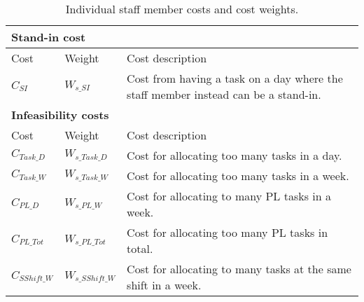 \begin{table}[!h]
\centering
\caption{Individual staff member costs and cost weights.}
\label{tab:staff member_costs}
\begin{tabular}{|l|l|p{7cm}|}
\hline
\multicolumn{3}{|l|}{\cellcolor{gray!90} \textbf{Stand-in cost}} \\ \hline
\rowcolor{Gray} Cost & Weight & Cost description \\ \hline
$C_{SI}$ & $W_{s\_SI}$ & Cost from having a task on a day where the staff member instead can be a stand-in. \\ \hline
\multicolumn{3}{|l|}{\cellcolor{gray!90} \textbf{Infeasibility costs}} \\ \hline
\rowcolor{Gray} Cost & Weight & Cost description \\ \hline
$C_{Task\_D}$ & $W_{s\_Task\_D}$ & Cost for allocating too many tasks in a day. \\ \hline
$C_{Task\_W}$ & $W_{s\_Task\_W}$ & Cost for allocating too many tasks in a week.  \\ \hline
$C_{PL\_D}$ & $W_{s\_PL\_W}$ & Cost for allocating to many PL tasks in a week. \\ \hline
$C_{PL\_Tot}$ & $W_{s\_PL\_Tot}$ & Cost for allocating too many PL tasks in total. \\ \hline
$C_{SShift\_W}$ & $W_{s\_SShift\_W}$ & Cost for allocating to many tasks at the same shift in a week. \\ \hline
\end{tabular}
\end{table}

